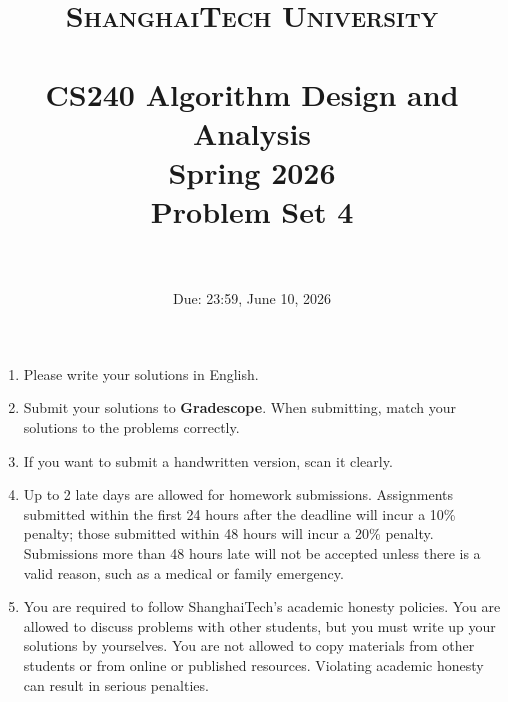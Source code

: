 \documentclass{article}
\title{
    \normalfont \normalsize
    \textsc{ShanghaiTech University} \\ [25pt]
    \horrule{0.5pt} \\[0.4cm] %
    \huge CS240 Algorithm Design and Analysis \\ %
    \LARGE Spring 2026\\
    \LARGE Problem Set 4\\
    \horrule{2pt} \\[0.5cm] %
}
\author{}
\date{Due: 23:59, June 10, 2026}
\begin{document}
\maketitle
\vspace{3ex}

\begin{enumerate}
\item Please write your solutions in English.
\item Submit your solutions to \textbf{Gradescope}. When submitting, match your solutions to the problems correctly.
\item If you want to submit a handwritten version, scan it clearly.
\item Up to 2 late days are allowed for homework submissions. Assignments submitted within the first 24 hours after the deadline will incur a 10\% penalty; those submitted within 48 hours will incur a 20\% penalty. Submissions more than 48 hours late will not be accepted unless there is a valid reason, such as a medical or family emergency.
\item You are required to follow ShanghaiTech's academic honesty policies. You are allowed to discuss problems with other students, but you must write up your solutions by yourselves. You are not allowed to copy materials from other students or from online or published resources. Violating academic honesty can result in serious penalties.
\end{enumerate}

\newpage






\end{document}
